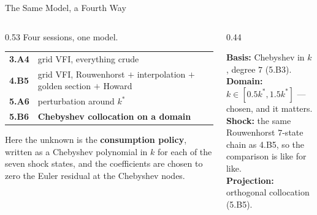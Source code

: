 \begin{frame}{The Same Model, a Fourth Way}
\begin{columns}[T]
\begin{column}{0.53\textwidth}
\small
Four sessions, one model.
\medskip
\begin{center}\footnotesize
\begin{tabularx}{\linewidth}{@{}>{\raggedright\arraybackslash}p{1.35cm} >{\raggedright\arraybackslash}X@{}}
\toprule
\textbf{3.A4} & grid VFI, everything crude \\
\textbf{4.B5} & grid VFI, Rouwenhorst $+$ interpolation $+$ golden section $+$ Howard \\
\textbf{5.A6} & perturbation around $k^{*}$ \\
\textbf{5.B6} & \textbf{Chebyshev collocation on a domain} \\
\bottomrule
\end{tabularx}
\end{center}
\medskip
Here the unknown is the \textbf{consumption policy}, written as a Chebyshev polynomial in $k$ for each of the seven shock states, and the coefficients are chosen to zero the Euler residual at the Chebyshev nodes.
\end{column}
\begin{column}{0.44\textwidth}
\begin{conceptbox}[title=\textbf{The commitments}]\small
\textbf{Basis:} Chebyshev in $k$, degree $7$ (5.B3).\\[1mm]
\textbf{Domain:} $k\in[0.5k^{*},1.5k^{*}]$ --- chosen, and it matters.\\[1mm]
\textbf{Shock:} the same Rouwenhorst $7$-state chain as 4.B5, so the comparison is like for like.\\[1mm]
\textbf{Projection:} orthogonal collocation (5.B5).
\end{conceptbox}
\end{column}
\end{columns}
\end{frame}

